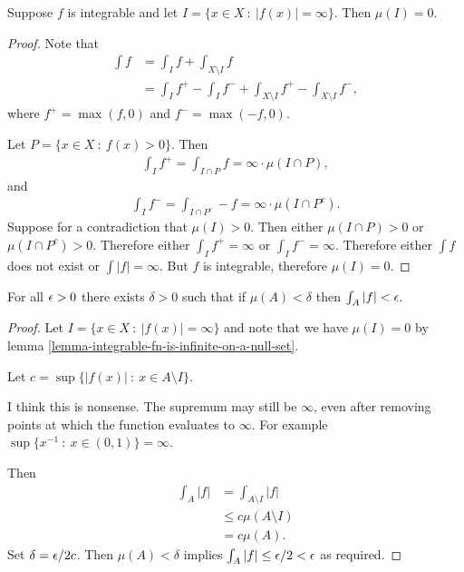 \begin{lemma}\label{lemma-integrable-fn-is-infinite-on-a-null-set}
  Suppose $f$ is integrable and let $I = \{x \in X ~:~ |f(x)| = \infty \}$. Then $\mu(I) = 0$.
\end{lemma}

\begin{proof}
  Note that
  \begin{align*}
    \int f &= \int_I f + \int_{X \setminus I} f \\
           &= \int_I f^+ - \int_I f^- + \int_{X \setminus I} f^+ - \int_{X \setminus I} f^-,
  \end{align*}
  where $f^+ = \max(f, 0)$ and $f^- = \max(-f, 0)$.

  Let $P = \{x \in X ~:~ f(x) > 0 \}$. Then
  \begin{align*}
    \int_I f^+ = \int_{I \cap P} f = \infty \cdot \mu(I \cap P),
  \end{align*}
  and
  \begin{align*}
    \int_I f^- = \int_{I \cap P^c} -f = \infty \cdot \mu(I \cap P^c).
  \end{align*}
  Suppose for a contradiction that $\mu(I) > 0$. Then either $\mu(I \cap P) > 0$ or $\mu(I \cap P^c) > 0$.
  Therefore either $\int_I f^+ = \infty$ or $\int_I f^- = \infty$. Therefore either $\int f$ does not exist
  or $\int |f| = \infty$. But $f$ is integrable, therefore $\mu(I) = 0$.
\end{proof}

\begin{claim*}
  For all $\epsilon > 0$ there exists $\delta > 0$ such that if $\mu(A) < \delta$ then $\int_A |f| < \epsilon$.
\end{claim*}

\begin{proof}
  Let $I = \{x \in X ~:~ |f(x)| = \infty \}$ and note that we have $\mu(I) = 0$ by lemma
  \eqref{lemma-integrable-fn-is-infinite-on-a-null-set}.

  Let $c = \sup \{|f(x)| ~:~ x \in A \setminus I\}$.

   I think this is nonsense. The supremum may still be $\infty$, even after removing points at which the
  function evaluates to $\infty$. For example $\sup \{x^{-1} ~:~ x \in (0, 1)\} = \infty$.

  Then
  \begin{align*}
    \int_A |f| &= \int_{A\setminus I} |f| \\
               &\leq c\mu(A \setminus I) \\
               &= c\mu(A).
  \end{align*}
  Set $\delta = \epsilon/2c$. Then $\mu(A) < \delta$ implies $\int_A |f| \leq \epsilon/2 < \epsilon$ as required.
\end{proof}


